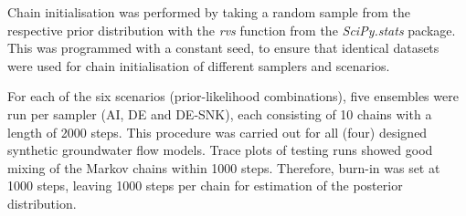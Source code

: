 Chain initialisation was performed by taking a random sample from the respective prior distribution with the \textit{rvs} function from the \textit{SciPy.stats} package. This was programmed with a constant seed, to ensure that identical datasets were used for chain initialisation of different samplers and scenarios.

For each of the six scenarios (prior-likelihood combinations), five ensembles were run per sampler (AI, DE and DE-SNK), each consisting of 10 chains with a length of 2000 steps. This procedure was carried out for all (four) designed synthetic groundwater flow models. Trace plots of testing runs showed good mixing of the Markov chains within 1000 steps. Therefore, burn-in was set at 1000 steps, leaving 1000 steps per chain for estimation of the posterior distribution. 

\newpage